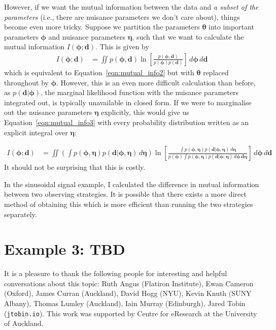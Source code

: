 \documentclass[entropy,article,accept,oneauthor,pdftex,10pt,a4paper]{mdpi}
\renewcommand{\d}{\boldsymbol{d}}
\newcommand{\x}{\boldsymbol{\theta}}
\newcommand{\bphi}{\boldsymbol{\phi}}
\newcommand{\boldeta}{\boldsymbol{\eta}}
\begin{document}
However, if we want the mutual information between the data and
{\em a subset of the parameters} (i.e., there are nuisance parameters
we don't care about), things become even more tricky. Suppose we
partition the parameters $\x$ into important parameters
$\bphi$ and nuisance parameters $\boldeta$, such that we want to calculate
the mutual information $I(\bphi; \d)$. This is given by
\begin{align}
I(\bphi; \d) &= \iint p(\bphi, \d)
                        \ln \left[\frac{p(\bphi, \d)}{p(\bphi)p(\d)}\right]
                        \, d\bphi \, d\d \label{eqn:mutual_info3}
\end{align}
which is equivalent to Equation~\ref{eqn:mutual_info2} but with
$\x$ replaced throughout by $\bphi$. However, this is an even more
difficult calculation than before, as $p(\d | \bphi)$, the marginal likelihood
function with the nuisance parameters integrated out, is typically
unavailable in closed form. If we were to marginalise out the nuisance
parameters $\boldeta$ explicitly, this would give us
Equation~\ref{eqn:mutual_info3} with every probability distribution
written as an explicit integral over $\boldeta$:

\begin{align}
I(\bphi; \d) &= \iint
  \left(\int p(\bphi, \boldeta)p(\d | \bphi, \boldeta) \, d\boldeta\right)
                        \ln \left[
  \frac{\int p(\bphi, \boldeta)p(\d | \bphi, \boldeta) \, d\boldeta}
{p(\bphi)\int p(\bphi, \boldeta)p(\d | \bphi, \boldeta) \, d\bphi \, \d\boldeta}\right]
                        \, d\bphi \, d\d
\end{align}
It should not be surprising that this is costly.

In the sinusoidal signal example, I calculated the difference in
mutual information between two observing strategies. It is possible
that there exists a more direct method of obtaining this which
is more efficient than running the two strategies separately.

\section{Example 3: TBD}

It is a pleasure to thank the following people for interesting and helpful
conversations about this topic: Ruth Angus (Flatiron Institute),
Ewan Cameron (Oxford), James Curran (Auckland),
David Hogg (NYU), Kevin Knuth (SUNY Albany),
Thomas Lumley (Auckland),
Iain Murray (Edinburgh), Jared Tobin ({\tt jtobin.io}).
This work was supported by Centre for eResearch
at the University of Auckland.
\end{document}
